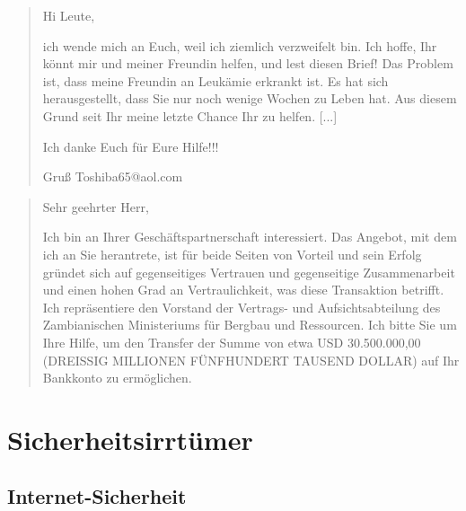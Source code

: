 \begin{frame}
\begin{quotation}
Hi Leute,

ich wende mich an Euch, weil ich ziemlich verzweifelt bin. Ich hoffe, Ihr könnt mir und meiner Freundin helfen, und lest diesen Brief! Das Problem ist, dass meine Freundin an Leukämie erkrankt ist. Es hat sich herausgestellt, dass Sie nur noch wenige Wochen zu Leben hat. Aus diesem Grund seit Ihr meine letzte Chance Ihr zu helfen. 
[...]

Ich danke Euch für Eure Hilfe!!!

Gruß Toshiba65@aol.com
\end{quotation}
\end{frame}


\begin{frame}
\begin{quotation}
Sehr geehrter Herr,

Ich bin an Ihrer Geschäftspartnerschaft interessiert. Das Angebot, mit dem ich an Sie herantrete, ist für beide Seiten von Vorteil und sein Erfolg gründet sich auf gegenseitiges Vertrauen und gegenseitige Zusammenarbeit und einen hohen Grad an Vertraulichkeit, was diese Transaktion betrifft. Ich repräsentiere den Vorstand der Vertrags- und Aufsichtsabteilung des Zambianischen Ministeriums für Bergbau und Ressourcen. Ich bitte Sie um Ihre Hilfe, um den Transfer der Summe von etwa USD 30.500.000,00 (DREISSIG MILLIONEN FÜNFHUNDERT TAUSEND DOLLAR) auf Ihr Bankkonto zu ermöglichen.
\end{quotation}
\end{frame}

\section{Sicherheitsirrtümer}

\subsection{Internet-Sicherheit}



